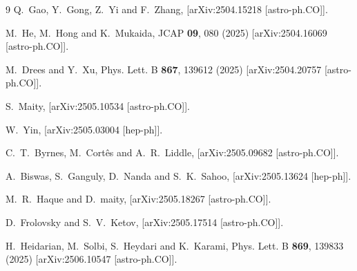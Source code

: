 \documentclass[aps,prev,twocolumn,preprintnumbers,floatfix,nofootinbib]{revtex4-1}
\begin{document}
\begin{thebibliography}{9}
Q.~Gao, Y.~Gong, Z.~Yi and F.~Zhang,
[arXiv:2504.15218 [astro-ph.CO]].

M.~He, M.~Hong and K.~Mukaida,
JCAP \textbf{09}, 080 (2025)
[arXiv:2504.16069 [astro-ph.CO]].

M.~Drees and Y.~Xu,
Phys. Lett. B \textbf{867}, 139612 (2025)
[arXiv:2504.20757 [astro-ph.CO]].

S.~Maity,
[arXiv:2505.10534 [astro-ph.CO]].

W.~Yin,
[arXiv:2505.03004 [hep-ph]].


C.~T.~Byrnes, M.~Cort\^es and A.~R.~Liddle,
[arXiv:2505.09682 [astro-ph.CO]].

A.~Biswas, S.~Ganguly, D.~Nanda and S.~K.~Sahoo,
[arXiv:2505.13624 [hep-ph]].

M.~R.~Haque and D.~maity,
[arXiv:2505.18267 [astro-ph.CO]].

D.~Frolovsky and S.~V.~Ketov,
[arXiv:2505.17514 [astro-ph.CO]].

H.~Heidarian, M.~Solbi, S.~Heydari and K.~Karami,
Phys. Lett. B \textbf{869}, 139833 (2025)
[arXiv:2506.10547 [astro-ph.CO]].



\end{thebibliography}
\end{document}
